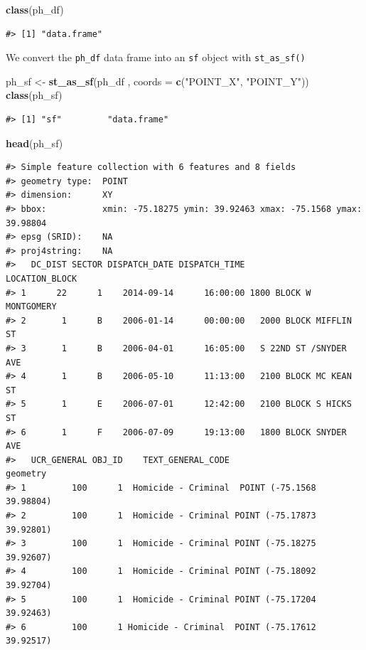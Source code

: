 \documentclass[]{book}
\newenvironment{Shaded}{\begin{snugshade}}{\end{snugshade}}
\newcommand{\KeywordTok}[1]{\textcolor[rgb]{0.13,0.29,0.53}{\textbf{#1}}}
\newcommand{\DataTypeTok}[1]{\textcolor[rgb]{0.13,0.29,0.53}{#1}}
\newcommand{\StringTok}[1]{\textcolor[rgb]{0.31,0.60,0.02}{#1}}
\newcommand{\NormalTok}[1]{#1}
\theoremstyle{definition}
\theoremstyle{definition}
\theoremstyle{definition}
\theoremstyle{remark}
\begin{document}
\begin{Shaded}
\begin{Highlighting}[]
\KeywordTok{class}\NormalTok{(ph_df)}
\end{Highlighting}
\end{Shaded}

\begin{verbatim}
#> [1] "data.frame"
\end{verbatim}

We convert the \texttt{ph\_df} data frame into an \texttt{sf} object
with \texttt{st\_as\_sf()}

\begin{Shaded}
\begin{Highlighting}[]
\NormalTok{ph_sf <-}\StringTok{ }\KeywordTok{st_as_sf}\NormalTok{(ph_df , }\DataTypeTok{coords =} \KeywordTok{c}\NormalTok{(}\StringTok{"POINT_X"}\NormalTok{, }\StringTok{"POINT_Y"}\NormalTok{))}
\KeywordTok{class}\NormalTok{(ph_sf)}
\end{Highlighting}
\end{Shaded}

\begin{verbatim}
#> [1] "sf"         "data.frame"
\end{verbatim}

\begin{Shaded}
\begin{Highlighting}[]
\KeywordTok{head}\NormalTok{(ph_sf)}
\end{Highlighting}
\end{Shaded}

\begin{verbatim}
#> Simple feature collection with 6 features and 8 fields
#> geometry type:  POINT
#> dimension:      XY
#> bbox:           xmin: -75.18275 ymin: 39.92463 xmax: -75.1568 ymax: 39.98804
#> epsg (SRID):    NA
#> proj4string:    NA
#>   DC_DIST SECTOR DISPATCH_DATE DISPATCH_TIME          LOCATION_BLOCK
#> 1      22      1    2014-09-14      16:00:00 1800 BLOCK W MONTGOMERY
#> 2       1      B    2006-01-14      00:00:00   2000 BLOCK MIFFLIN ST
#> 3       1      B    2006-04-01      16:05:00   S 22ND ST /SNYDER AVE
#> 4       1      B    2006-05-10      11:13:00   2100 BLOCK MC KEAN ST
#> 5       1      E    2006-07-01      12:42:00   2100 BLOCK S HICKS ST
#> 6       1      F    2006-07-09      19:13:00   1800 BLOCK SNYDER AVE
#>   UCR_GENERAL OBJ_ID    TEXT_GENERAL_CODE                   geometry
#> 1         100      1  Homicide - Criminal  POINT (-75.1568 39.98804)
#> 2         100      1  Homicide - Criminal POINT (-75.17873 39.92801)
#> 3         100      1  Homicide - Criminal POINT (-75.18275 39.92607)
#> 4         100      1  Homicide - Criminal POINT (-75.18092 39.92704)
#> 5         100      1  Homicide - Criminal POINT (-75.17204 39.92463)
#> 6         100      1 Homicide - Criminal  POINT (-75.17612 39.92517)
\end{verbatim}
\end{document}
